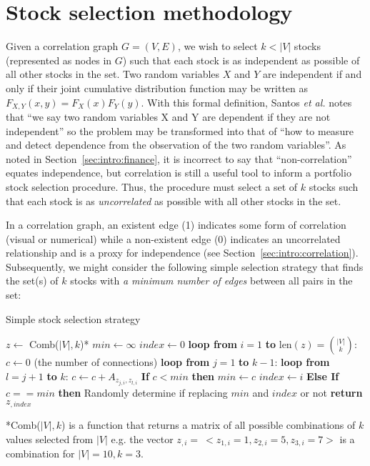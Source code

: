 \section{Stock selection methodology}
\label{sec:usage:stockselection}

Given a correlation graph $G=(V,E)$, we wish to select $k < |V|$ stocks 
(represented as nodes in $G$) such that each stock is as independent as 
possible of all other stocks in the set. Two random variables $X$ and $Y$ are 
independent if and only if their 
joint cumulative distribution function may be written as 
$F_{X,Y}(x,y)=F_X(x)F_Y(y)$. With this formal definition, Santos \textit{et 
al.} notes that ``we say two random variables X and Y are dependent if they
are not independent'' so the problem may be transformed into that of ``how to 
measure and detect dependence from the observation of the two random 
variables''\cite{santos2013}. As noted in Section~\ref{sec:intro:finance},
it is incorrect to say that ``non-correlation'' equates independence, 
but correlation is still a useful tool to inform a portfolio stock selection 
procedure. Thus, the procedure must select a set of $k$ stocks such that each 
stock is as \textit{uncorrelated} as possible with all other stocks in the set.

In a correlation graph, an existent edge (1) indicates some form of correlation 
(visual or numerical) while a non-existent edge (0) indicates an uncorrelated 
relationship and is a proxy for independence 
(see Section~\ref{sec:intro:correlation}). Subsequently, we might consider the 
following simple 
selection strategy that finds the set(s) of $k$ stocks with \textit{a minimum 
number of edges} between all pairs in the set:

\tablespacing
\begin{algorithm}[H]
	\caption{Simple stock selection strategy}\label{alg:usage:stockselection1}
	\begin{algorithmic}[1]
		\State $z \gets$ Comb($|V|,k$)*
		\State $min \gets \infty$
		\State $index \gets 0$
		\State \textbf{loop from} $i=1$ \textbf{to} $\text{len}(z) = 
		{|V| \choose k}$:
		\State \indent $c \gets 0$ (the number of connections)
		\State \indent \textbf{loop from} $j = 1$ \textbf{to} $k-1$:
		\State \indent \indent \textbf{loop from} $l=j+1$ \textbf{to} $k$:
		\State \indent \indent \indent $c \gets c+A_{z_{j,i},z_{l,i}}$
		\State \indent \textbf{If} $c < min$ \textbf{then}
		\State \indent \indent $min \gets c$
		\State \indent \indent $index \gets i$
		\State \indent \textbf{Else If} $c == min$ \textbf{then}
		\State \indent \indent Randomly determine if replacing $min$ and 
		$index$ or not
		\State \textbf{return} $z_{,index}$
		\EndProcedure
	\end{algorithmic}
	*Comb($|V|,k$) is a function that returns a matrix of all possible 
	combinations of $k$ values selected from $|V|$ e.g. the vector $z_{,i}= \ 
	<z_{1,i} = 1, z_{2,i} = 5, z_{3,i} = 7>$ is a combination for $|V|=10,k=3$.
\end{algorithm}
\bodyspacing

